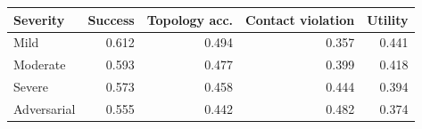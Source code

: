 \begin{tabular}{lrrrr}
\toprule
Severity & Success & Topology acc. & Contact violation & Utility \\
\midrule
Mild & 0.612 & 0.494 & 0.357 & 0.441 \\
Moderate & 0.593 & 0.477 & 0.399 & 0.418 \\
Severe & 0.573 & 0.458 & 0.444 & 0.394 \\
Adversarial & 0.555 & 0.442 & 0.482 & 0.374 \\
\bottomrule
\end{tabular}
